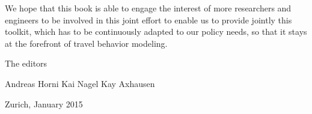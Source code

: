 We hope that this book is able to engage the interest of more researchers and engineers to be involved in this joint effort to enable us to provide jointly this toolkit, which has to be continuously adapted to our policy needs, so that it stays at the forefront of travel behavior modeling.

The editors

Andreas Horni 	Kai Nagel		Kay Axhausen

Zurich, January 2015



